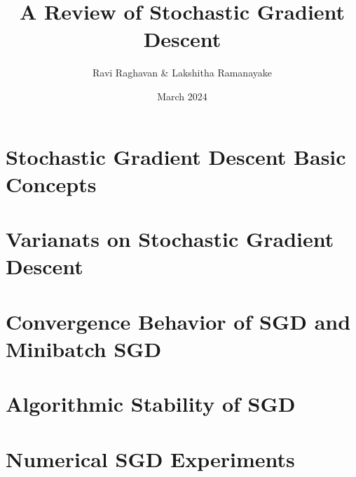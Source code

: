 \documentclass{article}
\title{A Review of Stochastic Gradient Descent}
\author{Ravi Raghavan \& Lakshitha Ramanayake}
\date{March 2024}
\begin{document}
 

\maketitle

\section{Stochastic Gradient Descent Basic Concepts}

\pagebreak
\section{Varianats on Stochastic Gradient Descent}

\pagebreak
\section{Convergence Behavior of SGD and Minibatch SGD}

\pagebreak
\section{Algorithmic Stability of SGD}

\pagebreak
\section{Numerical SGD Experiments}

\end{document}
